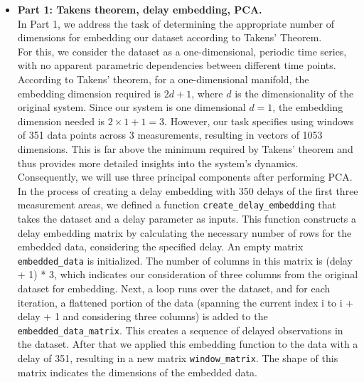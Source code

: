 \begin{itemize}
    \item \textbf{Part 1: Takens theorem, delay embedding, PCA.} \\
In Part 1, we address the task of determining the appropriate number of dimensions for embedding our dataset according to Takens' Theorem. \\

For this, we consider the dataset as a one-dimensional, periodic time series, with no apparent parametric dependencies between different time points. According to Takens' theorem, for a one-dimensional manifold, the embedding dimension required is \(2d+1\), where \(d\) is the dimensionality of the original system. Since our system is one dimensional \(d=1\), the embedding dimension needed is \(2\times 1+1=3\). However, our task specifies using windows of 351 data points across 3 measurements, resulting in vectors of 1053 dimensions. This is far above the minimum required by Takens' theorem and thus provides more detailed insights into the system's dynamics. Consequently, we will use three principal components after performing PCA. \\


In the process of creating a delay embedding with 350 delays of the first three measurement areas, we defined a function \texttt{create\_delay\_embedding} that takes the dataset and a delay parameter as inputs. This function constructs a delay embedding matrix by calculating the necessary number of rows for the embedded data, considering the specified delay. An empty matrix \texttt{embedded\_data} is initialized. The number of columns in this matrix is (delay + 1) * 3, which indicates our consideration of three columns from the original dataset for embedding. Next, a loop runs over the dataset, and for each iteration, a flattened portion of the data (spanning the current index i to i + delay + 1 and considering three columns) is added to the \texttt{embedded\_data\_matrix}. This creates a sequence of delayed observations in the dataset. After that we applied this embedding function to the data with a delay of 351, resulting in a new matrix \texttt{window\_matrix}. The shape of this matrix indicates the dimensions of the embedded data. 


\end{itemize}
